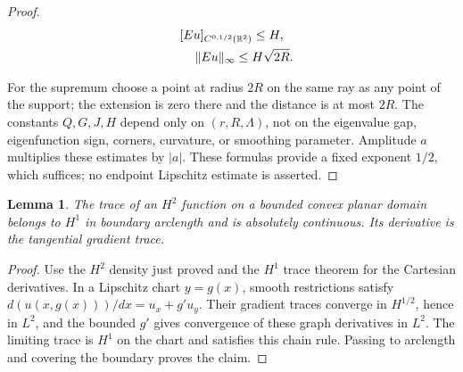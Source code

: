 \documentclass[11pt]{article}
\newtheorem{lemma}[theorem]{Lemma}
\theoremstyle{definition}
\theoremstyle{remark}
\numberwithin{equation}{section}
\begin{document}
\begin{proof}
\begin{equation}\label{eq:src-2-12}
\begin{gathered}
\relax[Eu]_{C^{0,1/2}(\mathbb R^2)}\le H, \\
\qquad \|Eu\|_\infty\le H\sqrt{2R}.
\end{gathered}
\end{equation}

For the supremum choose a point at radius $2R$ on the same ray as any point of the support; the extension is zero there and the distance is at most $2R$. The constants $Q,G,J,H$ depend only on $(r,R,\Lambda)$, not on the eigenvalue gap, eigenfunction sign, corners, curvature, or smoothing parameter. Amplitude $a$ multiplies these estimates by $|a|$. These formulas provide a fixed exponent $1/2$, which suffices; no endpoint Lipschitz estimate is asserted.

\end{proof}
\begin{lemma}\label{lem:boundary-traces}
The trace of an $H^2$ function on a bounded convex planar domain belongs to $H^1$ in boundary arclength and
is absolutely continuous. Its derivative is the tangential gradient trace.
\end{lemma}
\begin{proof}
Use the $H^2$ density just proved and the $H^1$ trace theorem
\cite[Theorem~1.5.1.3, p.~38]{Grisvard} for the Cartesian derivatives. In a Lipschitz chart $y=g(x)$, smooth
restrictions satisfy $d(u(x,g(x)))/dx=u_x+g'u_y$. Their gradient traces converge in $H^{1/2}$, hence in $L^2$,
and the bounded $g'$ gives convergence of these graph derivatives in $L^2$. The limiting trace is $H^1$ on
the chart and satisfies this chain rule. Passing to arclength and covering the boundary proves the claim.
\end{proof}
\end{document}
